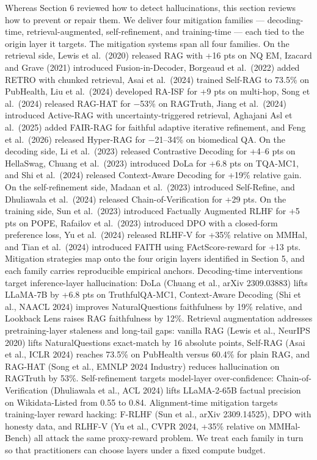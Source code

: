 Whereas Section 6 reviewed how to detect hallucinations, this section reviews how to prevent or repair them. We deliver four mitigation families --- decoding-time, retrieval-augmented, self-refinement, and training-time --- each tied to the origin layer it targets. The mitigation systems span all four families. On the retrieval side, Lewis et al.~(2020) released RAG with +16 pts on NQ EM, Izacard and Grave (2021) introduced Fusion-in-Decoder, Borgeaud et al.~(2022) added RETRO with chunked retrieval, Asai et al.~(2024) trained Self-RAG to 73.5\% on PubHealth, Liu et al.~(2024) developed RA-ISF for +9 pts on multi-hop, Song et al.~(2024) released RAG-HAT for −53\% on RAGTruth, Jiang et al.~(2024) introduced Active-RAG with uncertainty-triggered retrieval, Aghajani Asl et al.~(2025) added FAIR-RAG for faithful adaptive iterative refinement, and Feng et al.~(2026) released Hyper-RAG for −21--34\% on biomedical QA. On the decoding side, Li et al.~(2023) released Contrastive Decoding for +4--6 pts on HellaSwag, Chuang et al.~(2023) introduced DoLa for +6.8 pts on TQA-MC1, and Shi et al.~(2024) released Context-Aware Decoding for +19\% relative gain. On the self-refinement side, Madaan et al.~(2023) introduced Self-Refine, and Dhuliawala et al.~(2024) released Chain-of-Verification for +29 pts. On the training side, Sun et al.~(2023) introduced Factually Augmented RLHF for +5 pts on POPE, Rafailov et al.~(2023) introduced DPO with a closed-form preference loss, Yu et al.~(2024) released RLHF-V for +35\% relative on MMHal, and Tian et al.~(2024) introduced FAITH using FActScore-reward for +13 pts. Mitigation strategies map onto the four origin layers identified in Section 5, and each family carries reproducible empirical anchors. Decoding-time interventions target inference-layer hallucination: DoLa (Chuang et al., arXiv 2309.03883) lifts LLaMA-7B by +6.8 pts on TruthfulQA-MC1, Context-Aware Decoding (Shi et al., NAACL 2024) improves NaturalQuestions faithfulness by 19\% relative, and Lookback Lens raises RAG faithfulness by 12\%. Retrieval augmentation addresses pretraining-layer staleness and long-tail gaps: vanilla RAG (Lewis et al., NeurIPS 2020) lifts NaturalQuestions exact-match by 16 absolute points, Self-RAG (Asai et al., ICLR 2024) reaches 73.5\% on PubHealth versus 60.4\% for plain RAG, and RAG-HAT (Song et al., EMNLP 2024 Industry) reduces hallucination on RAGTruth by 53\%. Self-refinement targets model-layer over-confidence: Chain-of-Verification (Dhuliawala et al., ACL 2024) lifts LLaMA-2-65B factual precision on Wikidata-Listed from 0.55 to 0.84. Alignment-time mitigation targets training-layer reward hacking: F-RLHF (Sun et al., arXiv 2309.14525), DPO with honesty data, and RLHF-V (Yu et al., CVPR 2024, +35\% relative on MMHal-Bench) all attack the same proxy-reward problem. We treat each family in turn so that practitioners can choose layers under a fixed compute budget.

